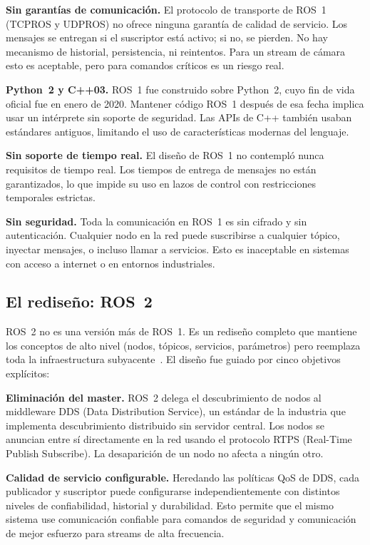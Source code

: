 \textbf{Sin garantías de comunicación.} El protocolo de transporte de ROS~1 (TCPROS y UDPROS) no ofrece ninguna garantía de calidad de servicio. Los mensajes se entregan si el suscriptor está activo; si no, se pierden. No hay mecanismo de historial, persistencia, ni reintentos. Para un stream de cámara esto es aceptable, pero para comandos críticos es un riesgo real.

\textbf{Python~2 y C++03.} ROS~1 fue construido sobre Python~2, cuyo fin de vida oficial fue en enero de 2020. Mantener código ROS~1 después de esa fecha implica usar un intérprete sin soporte de seguridad. Las APIs de C++ también usaban estándares antiguos, limitando el uso de características modernas del lenguaje.

\textbf{Sin soporte de tiempo real.} El diseño de ROS~1 no contempló nunca requisitos de tiempo real. Los tiempos de entrega de mensajes no están garantizados, lo que impide su uso en lazos de control con restricciones temporales estrictas.

\textbf{Sin seguridad.} Toda la comunicación en ROS~1 es sin cifrado y sin autenticación. Cualquier nodo en la red puede suscribirse a cualquier tópico, inyectar mensajes, o incluso llamar a servicios. Esto es inaceptable en sistemas con acceso a internet o en entornos industriales.

\subsection{El rediseño: ROS~2}

ROS~2 no es una versión más de ROS~1. Es un rediseño completo que mantiene los conceptos de alto nivel (nodos, tópicos, servicios, parámetros) pero reemplaza toda la infraestructura subyacente~\cite{macenski2022robot}. El diseño fue guiado por cinco objetivos explícitos:

\textbf{Eliminación del master.} ROS~2 delega el descubrimiento de nodos al middleware DDS (Data Distribution Service), un estándar de la industria que implementa descubrimiento distribuido sin servidor central. Los nodos se anuncian entre sí directamente en la red usando el protocolo RTPS (Real-Time Publish Subscribe). La desaparición de un nodo no afecta a ningún otro.

\textbf{Calidad de servicio configurable.} Heredando las políticas QoS de DDS, cada publicador y suscriptor puede configurarse independientemente con distintos niveles de confiabilidad, historial y durabilidad. Esto permite que el mismo sistema use comunicación confiable para comandos de seguridad y comunicación de mejor esfuerzo para streams de alta frecuencia.

